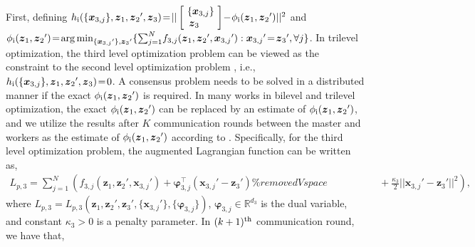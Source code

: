 \documentclass[letterpaper]{article} %
\begin{document}
First, defining  $h_{\rm{\uppercase\expandafter{\romannumeral1}}}(\{{\boldsymbol{x}_{3,j}}\},\boldsymbol{z}_1, {\boldsymbol{z}_2}',\boldsymbol{z}_3 ) \!=\!||\left[ \begin{array}{l}
\! \{{\boldsymbol{x}_{3,j}}\} \! \\
\boldsymbol{z}_3
\end{array} \right]  \!-\!\phi_{{\rm{\uppercase\expandafter{\romannumeral1}}}}({\boldsymbol{z}_1},{\boldsymbol{z}_2}')||^2 $ and $\phi_{\rm{\uppercase\expandafter{\romannumeral1}}}({\boldsymbol{z}_1},{\boldsymbol{z}_2}')\!=\! \mathop{\arg \min }\nolimits_{\{{\boldsymbol{x}_{3,j}}'\},{\boldsymbol{z}_3}'}\{ \sum\nolimits_{j=1}^N \! {{f_{3,j}}({\boldsymbol{z}_1},{\boldsymbol{z}_2}',{\boldsymbol{x}_{3,j}}')}: {\boldsymbol{x}_{3,j}}' \!=\! {\boldsymbol{z}_3}',\forall j\}$.  In trilevel optimization, the third level optimization problem can be viewed as the constraint to the second level optimization problem \cite{chen2022trilevel}, i.e., $h_{\rm{\uppercase\expandafter{\romannumeral1}}}(\{{\boldsymbol{x}_{3,j}}\},\boldsymbol{z}_1, {\boldsymbol{z}_2}',\boldsymbol{z}_3 )\!=\!0$.  A consensus problem needs to be solved in a distributed manner if the exact $\phi_{\rm{\uppercase\expandafter{\romannumeral1}}}({\boldsymbol{z}_1},{\boldsymbol{z}_2}')$ is required. In many works in bilevel \cite{ji2021bilevel,liu2021towards,jiao2022asynchronous} and trilevel \cite{sato2021gradient} optimization, the exact $\phi_{\rm{\uppercase\expandafter{\romannumeral1}}}({\boldsymbol{z}_1},{\boldsymbol{z}_2}')$ can be replaced by an estimate of $\phi_{\rm{\uppercase\expandafter{\romannumeral1}}}({\boldsymbol{z}_1},{\boldsymbol{z}_2}')$, and we utilize the results after $K$ communication rounds between the master and workers as the estimate of $\phi_{\rm{\uppercase\expandafter{\romannumeral1}}}({\boldsymbol{z}_1},{\boldsymbol{z}_2}')$ according to \cite{jiao2022asynchronous}. Specifically, for the third level optimization problem, the augmented Lagrangian function can be written as,
\begin{equation}
\begin{array}{l}
\! L_{p,3} \!=\! \sum\nolimits_{j = 1}^N ( {{f_{3,j}}({\boldsymbol{z}_1},{\boldsymbol{z}_2}'\!,{\boldsymbol{x}_{3,j}}')} + {\boldsymbol{\varphi}_{3,j}^{\top}}({\boldsymbol{x}_{3,j}}'- {\boldsymbol{z}_3}') \%removedVspace
\qquad \qquad \quad \, + \frac{\kappa_3}{2}||{\boldsymbol{x}_{3,j}}'- {\boldsymbol{z}_3}'||^2 ),
\end{array}
\end{equation}
where $L_{p,3} = L_{p,3}({\boldsymbol{z}_1},\!{\boldsymbol{z}_2}'\!, {\boldsymbol{z}_3}'\!,\! \{{\boldsymbol{x}_{3,j}}'\},\! \{\boldsymbol{\varphi}_{3,j}\})$, $\boldsymbol{\varphi}_{3,j} \!\in\! \mathbb{R}^{d_3}$ is the dual variable, and constant $\kappa_3\!>\!0$ is a penalty parameter. In $(k+1)^{\rm{th}}$ communication round, we have that,
\end{document}
